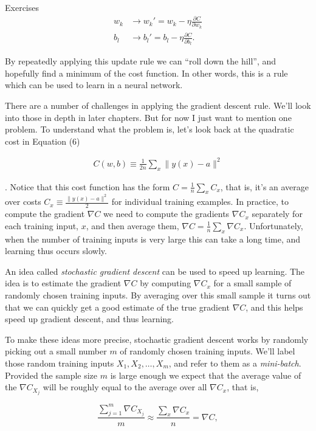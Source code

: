\begin{exerciseBox}{Exercises}
\begin{align}
w_k &\rightarrow w_k' = w_k-\eta \frac{\partial C}{\partial w_k} \tag{16} \\ b_l &\rightarrow b_l' = b_l-\eta \frac{\partial C}{\partial b_l}. \tag{17}
\end{align}

\noindent By repeatedly applying this update rule we can ``roll down the hill'', and hopefully find a minimum of the cost function. In other words, this is a rule which can be used to learn in a neural network.


There are a number of challenges in applying the gradient descent rule. We'll look into those in depth in later chapters. But for now I just want to mention one problem. To understand what the problem is, let's look back at the quadratic cost in Equation (6)

\begin{align*}
C(w,b) \equiv \frac{1}{2n} \sum_x \| y(x) - a\|^2 \nonumber
\end{align*}

\noindent. Notice that this cost function has the form $C = \frac{1}{n} \sum_x C_x$, that is, it's an average over costs $C_x \equiv \frac{\|y(x)-a\|^2}{2}$ for individual training examples. In practice, to compute the gradient $\nabla C$ we need to compute the gradients $\nabla C_x$ separately for each training input, $x$, and then average them, $\nabla C = \frac{1}{n} \sum_x \nabla C_x$. Unfortunately, when the number of training inputs is very large this can take a long time, and learning thus occurs slowly.


An idea called \emph{stochastic gradient descent} can be used to speed up learning. The idea is to estimate the gradient $\nabla C$ by computing $\nabla C_x$ for a small sample of randomly chosen training inputs. By averaging over this small sample it turns out that we can quickly get a good estimate of the true gradient $\nabla C$, and this helps speed up gradient descent, and thus learning.


To make these ideas more precise, stochastic gradient descent works by randomly picking out a small number $m$ of randomly chosen training inputs. We'll label those random training inputs $X_1, X_2, \ldots, X_m$, and refer to them as a \emph{mini-batch}. Provided the sample size $m$ is large enough we expect that the average value of the $\nabla C_{X_j}$ will be roughly equal to the average over all $\nabla C_x$, that is,

\begin{equation}
\frac{\sum_{j=1}^m \nabla C_{X_{j}}}{m} \approx \frac{\sum_x \nabla C_x}{n} = \nabla C,
\tag{18}
\end{equation}


\end{exerciseBox}
